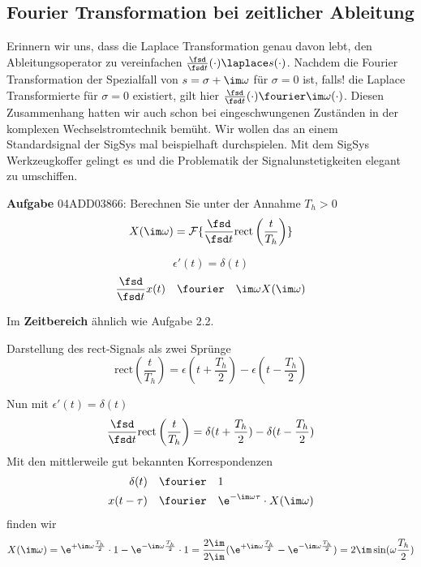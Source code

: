 \subsection{Fourier Transformation bei zeitlicher Ableitung}
\label{sec:04ADD03866}
\begin{Ziel}
Erinnern wir uns, dass die Laplace Transformation genau davon lebt, den
Ableitungsoperator zu vereinfachen $\frac{\fsd}{\fsd t}(\cdot) \laplace s(\cdot)$.
Nachdem  die Fourier Transformation der Spezialfall von $s=\sigma+\im\omega$ für
$\sigma=0$ ist, falls! die Laplace Transformierte für $\sigma=0$ existiert,
gilt hier $\frac{\fsd}{\fsd t}(\cdot) \fourier \im\omega(\cdot)$. Diesen Zusammenhang
hatten wir auch schon bei eingeschwungenen Zuständen in der komplexen Wechselstromtechnik
bemüht.
Wir wollen das an einem Standardsignal der SigSys mal beispielhaft
durchspielen. Mit dem SigSys Werkzeugkoffer gelingt es und die Problematik der
Signalunstetigkeiten elegant zu umschiffen.
\end{Ziel}
\textbf{Aufgabe} {\tiny 04ADD03866}: Berechnen Sie unter der Annahme $T_h>0$
\begin{equation}
  X(\im\omega) = \mathcal{F}\{\frac{\fsd}{\fsd t} \mathrm{rect}\left(\frac{t}{T_h}\right)\}
\end{equation}
\begin{Werkzeug}
\begin{equation}
  \epsilon'(t) = \delta(t)
\end{equation}
\begin{equation}
\frac{\fsd}{\fsd t} x(t) \quad\fourier\quad \im\omega X(\im\omega)
\end{equation}
\end{Werkzeug}
\begin{Ansatz}
Im \textbf{Zeitbereich} ähnlich wie Aufgabe 2.2.

Darstellung des rect-Signals als zwei Sprünge
\begin{equation}
  \mathrm{rect}\left(\frac{t}{T_h}\right) = \epsilon(t+\frac{T_h}{2}) - \epsilon(t-\frac{T_h}{2})
\end{equation}
\end{Ansatz}

\begin{ExCalc}
Nun mit $\epsilon'(t) = \delta(t)$
\begin{equation}
\frac{\fsd}{\fsd t} \mathrm{rect}\left(\frac{t}{T_h}\right) = \delta(t+\frac{T_h}{2}) - \delta(t-\frac{T_h}{2})
\end{equation}
Mit den mittlerweile gut bekannten Korrespondenzen
\begin{align}
\delta(t) &\quad \fourier \quad 1\\
x(t-\tau) &\quad \fourier \quad \e^{-\im\omega\tau} \cdot X(\im\omega)
\end{align}
finden wir
\begin{equation}
X(\im\omega) = \e^{+\im\omega\frac{T_h}{2}}\cdot 1 - \e^{-\im\omega\frac{T_h}{2}}\cdot 1
= \frac{2\im}{2\im}(\e^{+\im\omega\frac{T_h}{2}} - \e^{-\im\omega\frac{T_h}{2}})
= 2\im \sin(\omega\frac{T_h}{2})
\end{equation}
\end{ExCalc}

